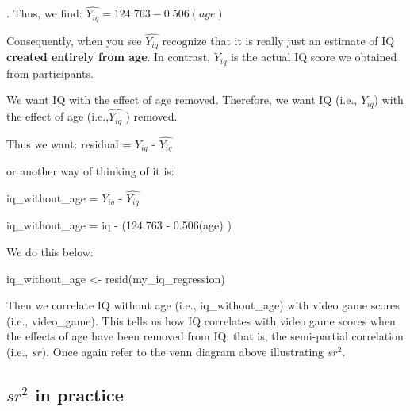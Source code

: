 \documentclass[
]{krantz}
\makeatletter
\newenvironment{Shaded}{\begin{snugshade}}{\end{snugshade}}
\newcommand{\CommentTok}[1]{\textcolor[rgb]{0.37,0.37,0.37}{\textit{#1}}}
\newcommand{\FunctionTok}[1]{\textcolor[rgb]{0,0,0}{#1}}
\newcommand{\NormalTok}[1]{#1}
\newcommand{\OtherTok}[1]{\textcolor[rgb]{0.37,0.37,0.37}{#1}}
\newcommand{\SpecialCharTok}[1]{\textcolor[rgb]{0,0,0}{#1}}
\newenvironment{kframe}{%
\medskip{}
\setlength{\fboxsep}{.8em}
 \def\at@end@of@kframe{}%
 \ifinner\ifhmode%
  \def\at@end@of@kframe{\end{minipage}}%
  \begin{minipage}{\columnwidth}%
 \fi\fi%
 \def\FrameCommand##1{\hskip\@totalleftmargin \hskip-\fboxsep
 \colorbox{shadecolor}{##1}\hskip-\fboxsep
     \hskip-\linewidth \hskip-\@totalleftmargin \hskip\columnwidth}%
 \MakeFramed {\advance\hsize-\width
   \@totalleftmargin\z@ \linewidth\hsize
   \@setminipage}}%
 {\par\unskip\endMakeFramed%
 \at@end@of@kframe}
\renewenvironment{Shaded}{\begin{kframe}}{\end{kframe}}
\makeatother
\begin{document}
.
Thus, we find: \(\widehat{Y_{iq}} = 124.763 - 0.506(age)\)

Consequently, when you see \(\widehat{Y_{iq}}\) recognize that it is really just an estimate of IQ \textbf{created entirely from age}. In contrast, \(Y_{iq}\) is the actual IQ score we obtained from participants.

We want IQ with the effect of age removed. Therefore, we want IQ (i.e., \(Y_{iq}\)) with the effect of age (i.e.,\(\widehat{Y_{iq}}\) ) removed.

Thus we want: residual = \(Y_{iq}\) - \(\widehat{Y_{iq}}\)

or another way of thinking of it is:

iq\_without\_age = \(Y_{iq}\) - \(\widehat{Y_{iq}}\)

iq\_without\_age = iq - (124.763 - 0.506(age) )

We do this below:

\begin{Shaded}
\begin{Highlighting}[]
\NormalTok{iq\_without\_age }\OtherTok{\textless{}{-}} \FunctionTok{resid}\NormalTok{(my\_iq\_regression) }
\end{Highlighting}
\end{Shaded}

Then we correlate IQ without age (i.e., iq\_without\_age) with video game scores (i.e., video\_game). This tells us how IQ correlates with video game scores when the effects of age have been removed from IQ; that is, the semi-partial correlation (i.e., \(sr\)). Once again refer to the venn diagram above illustrating \(sr^2\).

\begin{Shaded}
\end{Shaded}

\hypertarget{sr2-in-practice}{%
\subsection{\texorpdfstring{\(sr^2\) in practice}{sr\^{}2 in practice}}\label{sr2-in-practice}}
\end{document}
